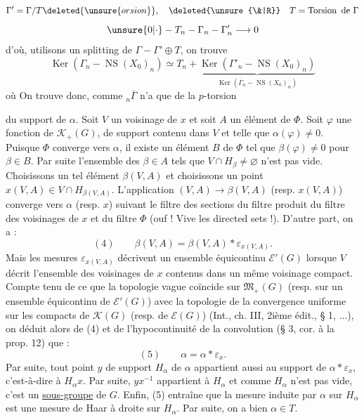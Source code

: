 \[
\Gamma'=\Gamma/T\deleted{\unsure{orsion}},\quad\deleted{\unsure{\&|R}}\quad T=\operatorname{Torsion}\text{ de }\Gamma
\]
\[
\unsure{0|\cdot}\mathbin{-}T_n\mathbin{-}\Gamma_n\mathbin{-}\Gamma'_n\longrightarrow0
\]
d'où, utilisons un splitting de $\Gamma\mathbin{-}\Gamma'\oplus T$, on trouve
\[
\operatorname{Ker}(\Gamma_n\mathbin{-}\operatorname{NS}(X_0)_n)\simeq T_n+\underbrace{\operatorname{Ker}(\Gamma'_n\mathbin{-}\operatorname{NS}(X_0)_n)}_{\operatorname{Ker}(\overline\Gamma_n\mathbin{-}\operatorname{NS}(X_0)_n)}
\]
où
On trouve donc, comme ${}_n\overline\Gamma$  n'a que de la $p$-torsion

du support de $\alpha$. Soit $V$ un voisinage de $x$ et soit $A$ un élément de $\Phi$. Soit $\varphi$ une fonction de $\mathcal K_+(G)$, de support contenu dans $V$ et telle que $\alpha(\varphi)\ne 0$. Puisque $\Phi$ converge vers $\alpha$, il existe un élément $B$ de $\Phi$ tel que $\beta(\varphi)\ne 0$ pour $\beta\in B$. Par suite l'ensemble des $\beta\in A$ tels que $V\cap H_\beta\ne\varnothing$ n'est pas vide. Choisissons un tel élément $\beta(V,A)$ et choisissons un point $x(V,A)\in V\cap H_{\beta(V,A)}$. L'application $(V,A)\longrightarrow\beta(V,A)$ (resp. $x(V,A)$) converge vers $\alpha$ (resp. $x$) suivant le filtre des sections du filtre produit du filtre des voisinages de $x$ et du filtre $\Phi$ (ouf ! Vive les directed sets !). D'autre part, on a :
\[
(4)\qquad\beta(V,A)=\beta(V,A)*\varepsilon_{x(V,A)}.
\]
Mais les mesures $\varepsilon_{x(V,A)}$ décrivent un ensemble équicontinu $\mathcal E'(G)$ lorsque $V$ décrit l'ensemble des voisinages de $x$ contenus dans un même voisinage compact. Compte tenu de ce que la topologie vague coïncide sur $\mathfrak M_+(G)$ (resp. sur un ensemble équicontinu de $\mathcal E'(G)$) avec la topologie de la convergence uniforme sur les compacts de $\mathcal K(G)$ (resp. de $\mathcal E(G)$) (Int., ch. III, 2ième édit., § 1, $\ldots$), on déduit alors de (4) et de l'hypocontinuité de la convolution (§ 3, cor. à la prop. 12) que :
\[
(5)\qquad\alpha=\alpha*\varepsilon_x.
\]
Par suite, tout point $y$ de support $H_\alpha$ de $\alpha$ appartient aussi au support de $\alpha*\varepsilon_x$, c'est-à-dire à $H_\alpha x$. Par suite, $yx^{-1}$ appartient à $H_\alpha$ et comme $H_\alpha$ n'est pas vide, c'est un \uline{sous-groupe} de $G$. Enfin, (5) entraîne que la mesure induite par $\alpha$ sur $H_\alpha$ est une mesure de Haar à droite sur $H_\alpha$. Par suite, on a bien $\alpha\in T$.

